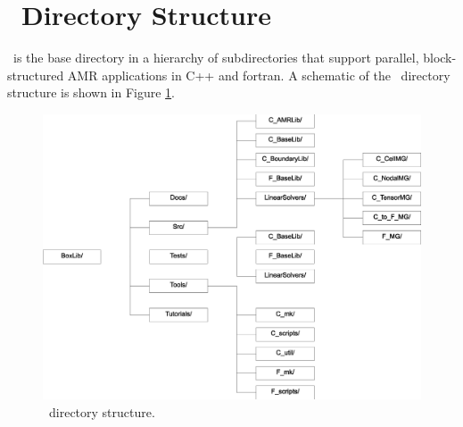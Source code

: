 \section{\BoxLib\ Directory Structure}

\BoxLib\ is the base directory in a hierarchy of subdirectories that
support parallel, block-structured AMR applications in C++ and fortran.
A schematic of the \BoxLib\ directory structure is shown in Figure 
\ref{fig:boxlib_directory}.
\begin{figure}[h]
\centering
\includegraphics[width=6.5in]{./BoxLib/boxlib_directory_bw2}
\caption{\label{fig:boxlib_directory}\BoxLib\ directory structure.}
\end{figure}

